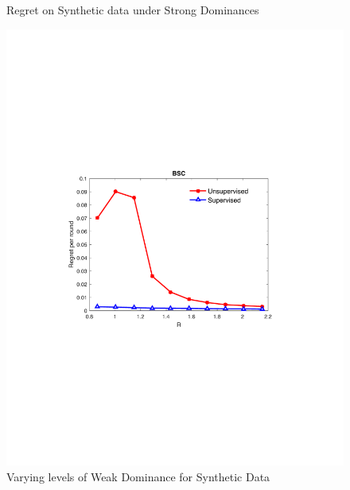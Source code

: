 \documentclass[11pt]{article} %
\begin{document}
\begin{center}
\begin{figure}[!bt]
\begin{minipage}{8cm}
		\caption{\footnotesize Regret on Synthetic data under Strong Dominances}
\label{fig:BSC_SD}
	\end{minipage}
	\begin{minipage}{8cm}
		\centering
		\includegraphics[scale=0.45]{BSC_WD1}
				\vspace{-.3cm}
		\caption{\footnotesize Varying levels of Weak Dominance for Synthetic Data}
\label{fig:BSC_WD}
	\end{minipage}
%
\vspace{10pt}


\end{figure}
\end{center}
\end{document}
